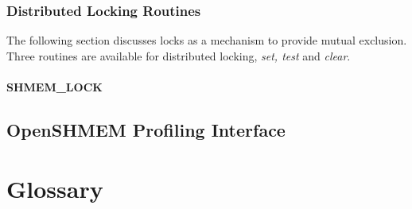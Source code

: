 \documentclass[10pt,oneside]{book}
\begin{document}
\subsection{Distributed Locking Routines}
The following section discusses \openshmem locks as a mechanism to provide
mutual exclusion. Three routines are available for distributed locking,
\textit{set, test} and \textit{clear}.

\subsubsection{\textbf{SHMEM\_LOCK}}\label{subsec:shmem_lock}






\section{OpenSHMEM Profiling Interface}\label{sec:openshmem_profiling_interface}


\clearpage


\chapter*{Glossary}


\clearpage
{}
{}
\printindex
\end{document}
